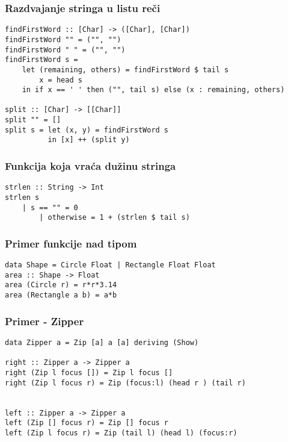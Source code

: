 \documentclass{beamer}
\begin{document}
\begin{frame}[fragile]
\frametitle{Razdvajanje stringa u listu reči}
\begin{lstlisting}
findFirstWord :: [Char] -> ([Char], [Char])
findFirstWord "" = ("", "")
findFirstWord " " = ("", "")
findFirstWord s =
    let (remaining, others) = findFirstWord $ tail s
        x = head s
    in if x == ' ' then ("", tail s) else (x : remaining, others)

split :: [Char] -> [[Char]]
split "" = []
split s = let (x, y) = findFirstWord s
          in [x] ++ (split y)
\end{lstlisting}
\end{frame}

\begin{frame}[fragile]
\frametitle{Funkcija koja vraća dužinu stringa}
\begin{lstlisting}
strlen :: String -> Int
strlen s
    | s == "" = 0
        | otherwise = 1 + (strlen $ tail s)
\end{lstlisting}
\end{frame}



\begin{frame}[fragile]
\frametitle{Primer funkcije nad tipom}
\begin{lstlisting}
data Shape = Circle Float | Rectangle Float Float 
area :: Shape -> Float 
area (Circle r) = r*r*3.14
area (Rectangle a b) = a*b
\end{lstlisting}
\end{frame}


\begin{frame}[fragile]
\frametitle{Primer - Zipper}
\begin{lstlisting}
data Zipper a = Zip [a] a [a] deriving (Show)

right :: Zipper a -> Zipper a
right (Zip l focus []) = Zip l focus [] 
right (Zip l focus r) = Zip (focus:l) (head r ) (tail r)


left :: Zipper a -> Zipper a
left (Zip [] focus r) = Zip [] focus r
left (Zip l focus r) = Zip (tail l) (head l) (focus:r)

\end{lstlisting}
\end{frame}
\end{document}
